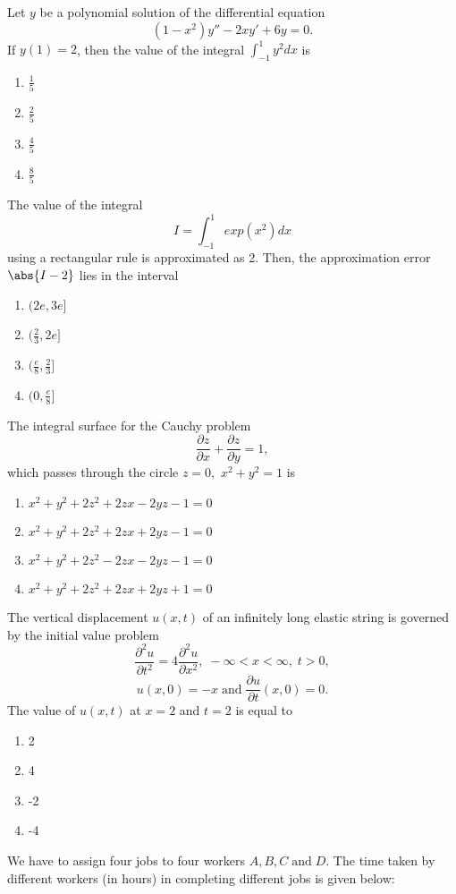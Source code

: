 \item Let $y$ be a polynomial solution of the differential equation $$(1-x^2)y''-2xy'+6y=0.$$ If $y(1)=2$, then the value of the integral $\int_{-1}^{1}y^2dx$ is
\begin{enumerate}
    \item $\frac{1}{5}$
    \item $\frac{2}{5}$
    \item $\frac{4}{5}$
    \item $\frac{8}{5}$
\end{enumerate}
\item The value of the integral $$I=\int_{-1}^{1}exp(x^2)dx$$ using a rectangular rule is approximated as 2. Then, the approximation error $\abs{I-2}$ lies in the interval
\begin{enumerate}
    \item $(2e,3e]$
    \item $(\frac{2}{3},2e]$
    \item $(\frac{e}{8},\frac{2}{3}]$
    \item $(0,\frac{e}{8}]$
\end{enumerate}
\item The integral surface for the Cauchy problem $$\frac{\partial z}{\partial x}+\frac{\partial z}{\partial y}=1,$$ which passes through the circle $z=0,$ $x^2+y^2=1$ is
\begin{enumerate}
    \item $x^2+y^2+2z^2+2zx-2yz-1=0$
    \item $x^2+y^2+2z^2+2zx+2yz-1=0$
    \item $x^2+y^2+2z^2-2zx-2yz-1=0$
    \item $x^2+y^2+2z^2+2zx+2yz+1=0$
\end{enumerate}
\item The vertical displacement $u(x,t)$ of an infinitely long elastic string is governed by the initial value problem $$\frac{\partial^2 u}{\partial t^2}=4\frac{\partial^2 u}{\partial x^2}, \; -\infty <x<\infty, \; t>0,$$ $$u(x,0)=-x \; \text{and} \; \frac{\partial{u}}{\partial{t}}(x,0)=0.$$ The value of $u(x,t)$ at $x=2$ and $t=2$ is equal to
\begin{enumerate}
    \item 2
    \item 4
    \item -2
    \item -4
\end{enumerate}
\item We have to assign four jobs  to four workers $A, B, C \; \text{and} \; D$. The time taken by different workers (in hours) in completing different jobs is given below: 
